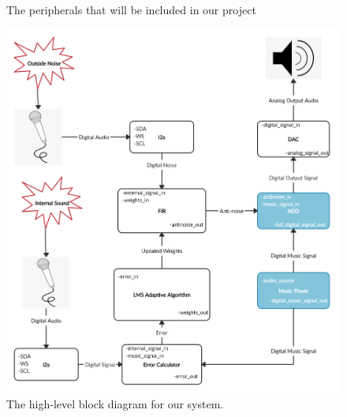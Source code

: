 \documentclass[12pt]{fpgairpods}
\begin{document}
\begin{multicols}{2}
\end{multicols}


\begin{figure}
\def\svgwidth{\linewidth}

\caption{The peripherals that will be included in our project}
\label{fig:peripherals}
\end{figure}

\begin{figure}
\includegraphics[width=\textwidth]{Proposal Block Diagram.png}
\caption{The high-level block diagram for our system.}
\label{fig:blockdiagram}
\end{figure}


\newpage
\end{document}

